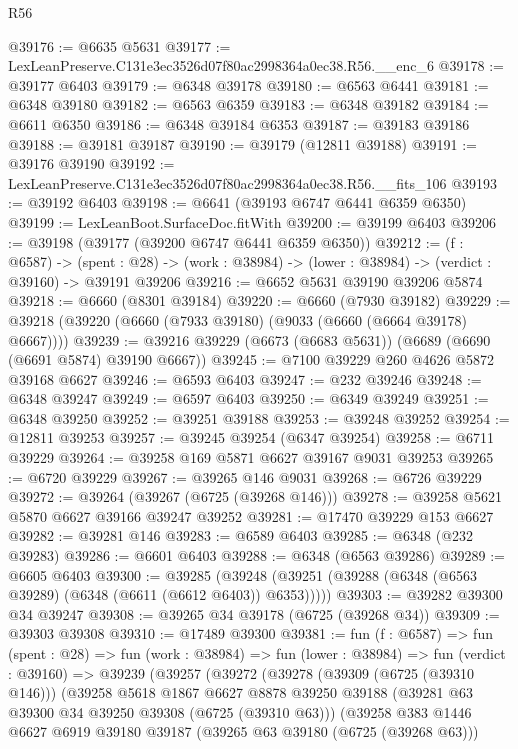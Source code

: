 \begin{lexlean}{R56}
\begin{coremodule}
@39176 := @6635 @5631
@39177 := LexLeanPreserve.C131e3ec3526d07f80ac2998364a0ec38.R56.__enc_6
@39178 := @39177 @6403
@39179 := @6348 @39178
@39180 := @6563 @6441
@39181 := @6348 @39180
@39182 := @6563 @6359
@39183 := @6348 @39182
@39184 := @6611 @6350
@39186 := @6348 @39184 @6353
@39187 := @39183 @39186
@39188 := @39181 @39187
@39190 := @39179 (@12811 @39188)
@39191 := @39176 @39190
@39192 := LexLeanPreserve.C131e3ec3526d07f80ac2998364a0ec38.R56.__fits_106
@39193 := @39192 @6403
@39198 := @6641 (@39193 @6747 @6441 @6359 @6350)
@39199 := LexLeanBoot.SurfaceDoc.fitWith
@39200 := @39199 @6403
@39206 := @39198 (@39177 (@39200 @6747 @6441 @6359 @6350))
@39212 := (f : @6587) ->
  (spent : @28) -> (work : @38984) -> (lower : @38984) -> (verdict : @39160) -> @39191 @39206
@39216 := @6652 @5631 @39190 @39206 @5874
@39218 := @6660 (@8301 @39184)
@39220 := @6660 (@7930 @39182)
@39229 := @39218 (@39220 (@6660 (@7933 @39180) (@9033 (@6660 (@6664 @39178) @6667))))
@39239 := @39216 @39229 (@6673 (@6683 @5631)) (@6689 (@6690 (@6691 @5874) @39190 @6667))
@39245 := @7100 @39229 @260 @4626 @5872 @39168 @6627
@39246 := @6593 @6403
@39247 := @232 @39246
@39248 := @6348 @39247
@39249 := @6597 @6403
@39250 := @6349 @39249
@39251 := @6348 @39250
@39252 := @39251 @39188
@39253 := @39248 @39252
@39254 := @12811 @39253
@39257 := @39245 @39254 (@6347 @39254)
@39258 := @6711 @39229
@39264 := @39258 @169 @5871 @6627 @39167 @9031 @39253
@39265 := @6720 @39229
@39267 := @39265 @146 @9031
@39268 := @6726 @39229
@39272 := @39264 (@39267 (@6725 (@39268 @146)))
@39278 := @39258 @5621 @5870 @6627 @39166 @39247 @39252
@39281 := @17470 @39229 @153 @6627
@39282 := @39281 @146
@39283 := @6589 @6403
@39285 := @6348 (@232 @39283)
@39286 := @6601 @6403
@39288 := @6348 (@6563 @39286)
@39289 := @6605 @6403
@39300 := @39285
    (@39248 (@39251 (@39288 (@6348 (@6563 @39289) (@6348 (@6611 (@6612 @6403)) @6353)))))
@39303 := @39282 @39300 @34 @39247
@39308 := @39265 @34 @39178 (@6725 (@39268 @34))
@39309 := @39303 @39308
@39310 := @17489 @39300
@39381 := fun (f : @6587) =>
  fun (spent : @28) =>
  fun (work : @38984) =>
  fun (lower : @38984) =>
  fun (verdict : @39160) =>
  @39239
    (@39257
      (@39272
        (@39278
          (@39309 (@6725 (@39310 @146)))
          (@39258
            @5618
            @1867
            @6627
            @8878
            @39250
            @39188
            (@39281 @63 @39300 @34 @39250 @39308 (@6725 (@39310 @63)))
            (@39258
              @383
              @1446
              @6627
              @6919
              @39180
              @39187
              (@39265 @63 @39180 (@6725 (@39268 @63)))

\end{coremodule}
\end{lexlean}
